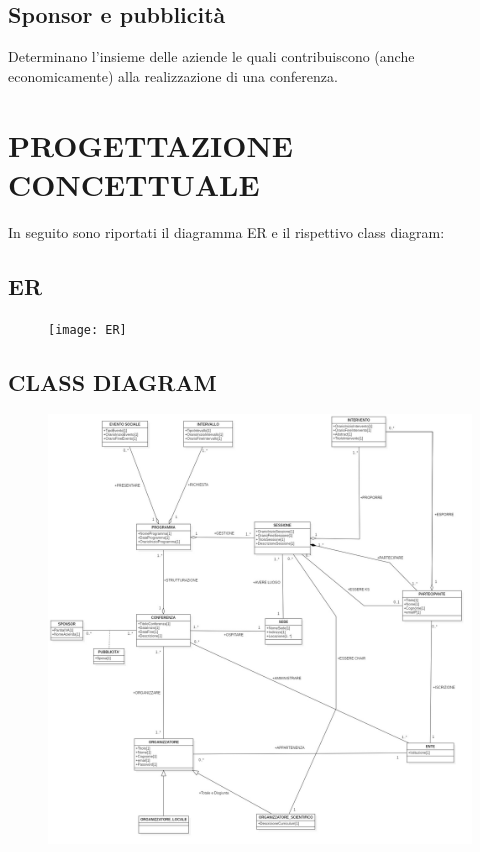 \documentclass[a4page]{article}
\begin{document}
\subsection{Sponsor e pubblicità}
Determinano l'insieme delle aziende le quali contribuiscono (anche economicamente) alla realizzazione di una conferenza.
\newpage
\section{PROGETTAZIONE CONCETTUALE}
In seguito sono riportati il diagramma ER e il rispettivo class diagram:
\subsection{ER}
\vspace{2cm}
\begin{figure}[h!]
\centering
\texttt{[image: ER]}
\end{figure}
\newpage
\subsection{CLASS DIAGRAM}
\vspace{2cm}
\begin{figure}[h!]
\centering
\includegraphics[width=17cm]{CSNR}
\label{mycsnr}
\end{figure}
\newpage
\vspace{2cm}
\end{document}
